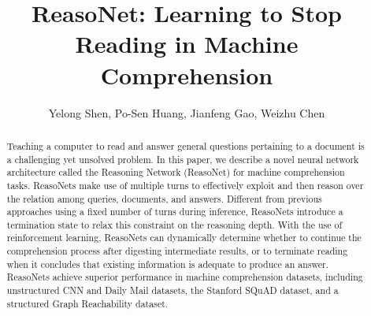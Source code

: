 \documentclass[sigconf]{acmart}
\begin{document}


\fancyhead{}

\title{ReasoNet: Learning to Stop Reading in Machine Comprehension}

%

\author{Yelong Shen, Po-Sen Huang, Jianfeng Gao, Weizhu Chen}



\begin{abstract}

Teaching a computer to read and answer general questions pertaining to a document is a challenging yet unsolved problem. In this paper, we describe a novel neural network architecture called the Reasoning Network ({ReasoNet}) for machine comprehension tasks. ReasoNets make use of multiple turns to effectively exploit and then reason over the relation among queries, documents, and answers. Different from previous approaches using a fixed number of turns during inference, ReasoNets introduce a termination state to relax this constraint on the reasoning depth. With the use of reinforcement learning, ReasoNets can dynamically determine whether to continue the comprehension process after digesting intermediate results, or to terminate reading when it concludes that existing information is adequate to produce an answer. ReasoNets achieve superior performance in machine comprehension datasets, including unstructured CNN and Daily Mail datasets, the Stanford SQuAD dataset, and a structured Graph Reachability dataset. 


\end{abstract}
\end{document}
